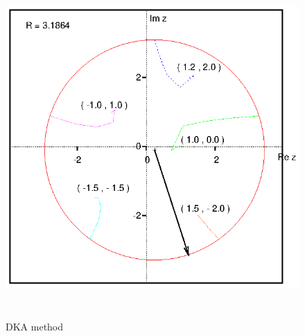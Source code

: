 \documentclass[12pt,a4paper,titlepage]{jarticle}
\begin{document}
\title{}
\author{A4SB2121}
\date{}

\begin{figure}[h]
\begin{center}
\includegraphics[width=190mm,height=130mm]{DKA_method.eps}
\caption{DKA method}
\end{center}
\end{figure}
\end{document}
